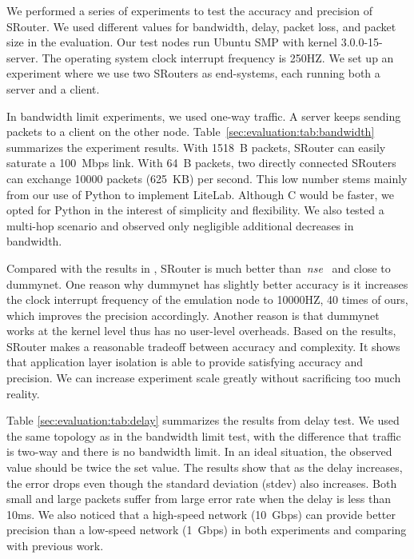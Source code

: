 \documentclass[conference]{IEEEtran}
\begin{document}
We performed a series of experiments to test the accuracy and
precision of SRouter. We used different values for bandwidth, delay,
packet loss, and packet size in the evaluation. Our test nodes run
Ubuntu SMP with kernel 3.0.0-15-server. The operating system clock
interrupt frequency is 250HZ.
We set up an experiment where we use two SRouters as end-systems, each
running both a server and a client.


In bandwidth limit experiments, we used one-way traffic. A server
keeps sending packets to a client on the other
node. Table~\ref{sec:evaluation:tab:bandwidth} summarizes the
experiment results.  With 1518~B packets, SRouter can easily saturate
a 100~Mbps link. With 64~B packets, two directly connected SRouters
can exchange 10000 packets (625~KB) per second. This low number stems
mainly from our use of Python to implement LiteLab. Although C would
be faster, we opted for Python in the interest of simplicity and
flexibility.
We also tested a multi-hop scenario and observed only negligible
additional decreases in bandwidth.


Compared with the results in \cite{White:osdi02}, SRouter is much
better than~\textit{nse}~\cite{780820} and close to dummynet. One
reason why dummynet has slightly better accuracy is it increases the
clock interrupt frequency of the emulation node to 10000HZ, 40 times
of ours, which improves the precision accordingly. Another reason is
that dummynet works at the kernel level thus has no user-level
overheads. Based on the results, SRouter makes a reasonable tradeoff
between accuracy and complexity. It shows that application layer
isolation is able to provide satisfying accuracy and precision.  We
can increase experiment scale greatly without sacrificing too much
reality.





Table \ref{sec:evaluation:tab:delay} summarizes the results from delay
test.  We used the same topology as in the bandwidth limit test, with
the difference that traffic is two-way and there is no bandwidth
limit.
In an ideal situation, the observed value should be twice the set
value. The results show that as the delay increases, the error drops
even though the standard deviation (stdev) also increases. Both small
and large packets suffer from large error rate when the delay is less
than 10ms.
We also noticed that a high-speed network (10~Gbps) can provide better
precision than a low-speed network (1~Gbps) in both experiments and
comparing with previous work\cite{White:osdi02}.
\end{document}

